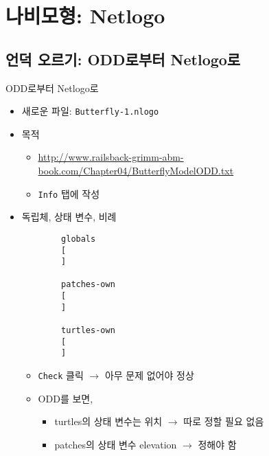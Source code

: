\documentclass[hyperref={unicode}]{beamer}
\begin{document}
\section{나비모형: Netlogo}
\subsection*{언덕 오르기: ODD로부터 Netlogo로}
\begin{frame}[fragile]{ODD로부터 Netlogo로}
\begin{itemize}
\item 새로운 파일: \verb|Butterfly-1.nlogo|
\item 목적
	\begin{itemize}
	\item \url{http://www.railsback-grimm-abm-book.com/Chapter04/ButterflyModelODD.txt}
	\item \verb|Info| 탭에 작성
	\end{itemize}	
\end{itemize}	
\end{frame}

\begin{frame}[fragile]
\begin{itemize}
\item 독립체, 상태 변수, 비례
		\begin{verbatim}
		globals
		[
		]

		patches-own
		[
		]

		turtles-own
		[
		]
		\end{verbatim}	
	\begin{itemize}
	\item \verb|Check| 클릭 $\rightarrow$ 아무 문제 없어야 정상
	\item ODD를 보면, 
		\begin{itemize}
		\item turtles의 상태 변수는 위치 $\rightarrow$ 따로 정할 필요 없음
		\item patches의 상태 변수 elevation $\rightarrow$ 정해야 함
		\end{itemize}
	\end{itemize}
\end{itemize}	
\end{frame}
\end{document}
